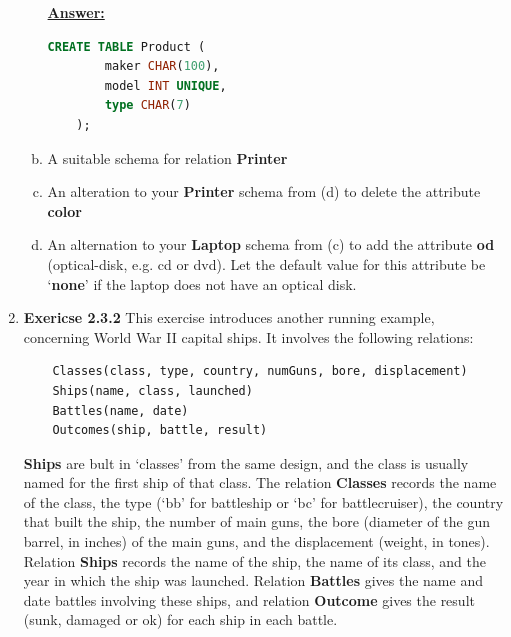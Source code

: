 \documentclass[12pt]{article}
\begin{document}
\begin{enumerate}[1.]
\begin{enumerate}[a)]
        \begin{mdframed}
            \underline{\textbf{Answer:}}

            \bigskip

    \begin{lstlisting}[language=SQL]
    CREATE TABLE Product (
        maker CHAR(100),
        model INT UNIQUE,
        type CHAR(7)
    );
    \end{lstlisting}

        \end{mdframed}

        \item A suitable schema for relation \textbf{Printer}


        \item An alteration to your \textbf{Printer} schema from (d) to delete
        the attribute \textbf{color}
        \item An alternation to your \textbf{Laptop} schema from (c) to add the
        attribute \textbf{od} (optical-disk, e.g. cd or dvd). Let the default value
        for this attribute be `\textbf{none}' if the laptop does not have an optical
        disk.
    \end{enumerate}

    \item \textbf{Exericse 2.3.2} This exercise introduces another running example,
    concerning World War II capital ships. It involves the following relations:

    \bigskip

    \begin{lstlisting}
    Classes(class, type, country, numGuns, bore, displacement)
    Ships(name, class, launched)
    Battles(name, date)
    Outcomes(ship, battle, result)
    \end{lstlisting}

    \textbf{Ships} are bult in `classes' from the same design, and the class is
    usually named for the first ship of that class. The relation \textbf{Classes}
    records the name of the class, the type (`bb' for battleship or `bc' for battlecruiser),
    the country that built the ship, the number of main guns, the bore (diameter of
    the gun barrel, in inches) of the main guns, and the displacement (weight, in tones).
    Relation \textbf{Ships} records the name of the ship, the name of its class,
    and the year in which the ship was launched. Relation \textbf{Battles} gives
    the name and date battles involving these ships, and relation \textbf{Outcome}
    gives the result (sunk, damaged or ok) for each ship in each battle.


\end{enumerate}
\end{document}
